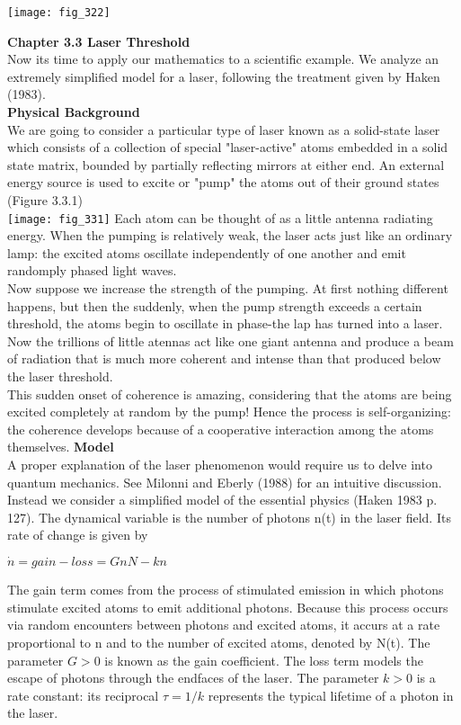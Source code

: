 \documentclass{article}
\newcommand\tab[1][1cm]{\hspace*{#1}}
\begin{document}
\texttt{[image: fig\_322]}

\textbf {Chapter 3.3 Laser Threshold} \\
Now its time to apply our mathematics to a scientific example. We analyze an extremely simplified model for a laser, following the treatment given by Haken (1983). \\
\textbf {Physical Background}
 \\ \tab
We are going to consider a particular type of laser known as a solid-state laser which consists of a collection of special "laser-active" atoms embedded in a solid state matrix, bounded by partially reflecting mirrors at either end. An external energy source is used to excite or "pump" the atoms out of their ground states (Figure 3.3.1) \\
\texttt{[image: fig\_331]} 
Each atom can be thought of as a little antenna radiating energy. When the pumping is relatively weak, the laser acts just like an ordinary lamp: the excited atoms oscillate independently of one another and emit randomply phased light waves. \\
\tab Now suppose we increase the strength of the pumping. At first nothing different happens, but then the suddenly, when the pump strength exceeds a certain threshold, the atoms begin to oscillate in phase-the lap has turned into a laser. Now the trillions of little atennas act like one giant antenna and produce a beam of radiation that is much more coherent and intense than that produced below the laser threshold. \\
\tab This sudden onset of coherence is amazing, considering that the atoms are being excited completely at random by the pump! Hence the process is self-organizing: the coherence develops because of a cooperative interaction among the atoms themselves. 
\textbf {Model} \\
A proper explanation of the laser phenomenon would require us to delve into quantum mechanics. See Milonni and Eberly (1988) for an intuitive discussion.
\\ \tab Instead we consider a simplified model of the essential physics (Haken 1983 p. 127). The dynamical variable is the number of photons n(t) in the laser field. Its rate of change is given by 
\begin{center}
$\dot{n}=gain-loss = GnN - kn$
\end{center}
The gain term comes from the process of stimulated emission in which photons stimulate excited atoms to emit additional photons. Because this process occurs via random encounters between photons and excited atoms, it accurs at a rate proportional to n and to the number of excited atoms, denoted by N(t). The parameter $G >0$ is known as the gain coefficient. The loss term models the escape of photons through the endfaces of the laser. The parameter $k>0$ is a rate constant: its reciprocal $\tau = 1/k$ represents the typical lifetime of a photon in the laser. \\
\end{document}
